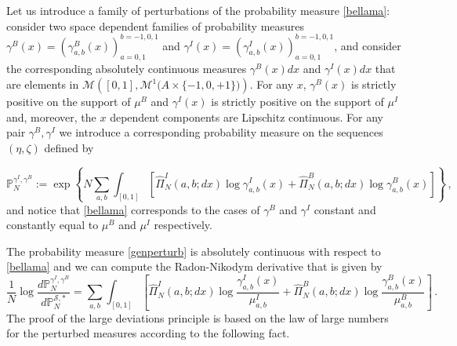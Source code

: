 \documentclass[reqno]{amsart}
\theoremstyle{plain}
\theoremstyle{definition}
\theoremstyle{remark}
\numberwithin{equation}{section}
\numberwithin{theorem}{section}
\renewcommand{\hat}{\widehat}
\newcommand{\<}{\langle}
\renewcommand{\>}{\rangle}
\begin{document}
	Let us introduce a family of perturbations of the probability measure \eqref{bellama}: consider two space dependent families of probability measures $\gamma^B(x)=(\gamma^B_{a,b}(x))_{a=0,1}^{b=-1,0,1}$ and $\gamma^I(x)=(\gamma^I_{a,b}(x))_{a=0,1}^{b=-1,0,1}$, and consider the corresponding absolutely continuous measures
	$\gamma^B(x)dx$ and $\gamma^I(x)dx$ that are elements in $\mathcal M\left([0,1], \mathcal M^1\big(A\times\{-1,0,+1\}\big)\right)$.  For any $x$, $\gamma^B(x)$ is strictly positive on the support of $\mu^B$ and $\gamma^I(x)$ is strictly positive on the support of $\mu^I$ and, moreover, the $x$ dependent components are Lipschitz continuous. For any pair $\gamma^B,\gamma^I$ we introduce a corresponding probability measure on the sequences $(\eta,\zeta)$ defined by
	
	\begin{equation}\label{genperturb}
		\mathbb P^{\gamma^I,\gamma^B}_N:= \exp\left\{N\sum_{a,b}\int_{[0,1]}\left[\hat \Pi^I_N(a,b; dx)\log \gamma^I_{a,b}(x)+\hat \Pi^B_N(a,b; dx)\log \gamma^B_{a,b}(x)\right]\right\}\,,
	\end{equation}
	and notice that \eqref{bellama} corresponds to the cases of $\gamma^B$ and $\gamma^I$ constant and constantly equal to $\mu^B$ and $\mu^I$ respectively.
	
	The probability measure \eqref{genperturb} is absolutely continuous with respect to \eqref{bellama} and we can compute the Radon-Nikodym derivative that is given by
	\begin{equation}\label{RN}
		\frac{1}{N}\log \frac{d \mathbb P^{\gamma^I,\gamma^B}_N}{d \mathbb P^{\mathcal S,*}_N}=\sum_{a,b}\int_{[0,1]}\left[\hat \Pi^I_N(a,b; dx)\log\frac{ \gamma^I_{a,b}(x)}{\mu^I_{a,b}}+\hat \Pi^B_N(a,b; dx)\log\frac{ \gamma^B_{a,b}(x)}{\mu^B_{a,b}}\right]\,.
	\end{equation}
	The proof of the large deviations principle is based on the law of large numbers for the perturbed measures according to the following fact.
	
\end{document}
